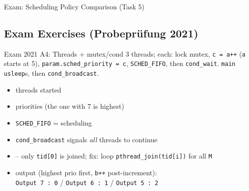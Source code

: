 \begin{example2}{Exam: Scheduling Policy Comparison (Task 5)}
\end{example2}

\subsection{Exam Exercises (Probepr\"ufung 2021)}

\begin{example2}{Exam 2021 A4: Threads + mutex/cond}
    3 threads; each: lock mutex, \texttt{c = a++} (\texttt{a} starts at 5),
    \texttt{param.sched\_priority = c}, \texttt{SCHED\_FIFO}, then \texttt{cond\_wait}.
    \texttt{main} \texttt{usleep}s, then \texttt{cond\_broadcast}.
    \tcblower
    \begin{itemize}
        \item {}  threads started
        \item {} priorities  (the one with 7 is highest)
        \item {} \texttt{SCHED\_FIFO} =  scheduling
        \item {} \texttt{cond\_broadcast} signals \emph{all} threads to continue
        \item {}  -- only \texttt{tid[0]} is joined; fix: loop
              \texttt{pthread\_join(tid[i])} for all \texttt{M}
        \item {} output (highest prio first, \texttt{b++} post-increment):\\
              \texttt{Output 7 : 0} / \texttt{Output 6 : 1} / \texttt{Output 5 : 2}
    \end{itemize}
\end{example2}


